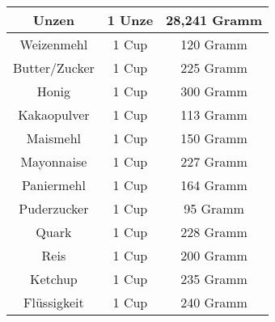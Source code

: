 \begin{center}
\begin{tabular}{|c|c|c|}
\hline 
Unzen & 1 Unze & 28,241 Gramm \\ 
\hline 
Weizenmehl & 1 Cup & 120 Gramm \\ 
\hline 
Butter/Zucker & 1 Cup & 225 Gramm \\ 
\hline 
Honig & 1 Cup & 300 Gramm \\ 
\hline 
Kakaopulver & 1 Cup & 113 Gramm \\ 
\hline 
Maismehl & 1 Cup & 150 Gramm \\ 
\hline 
Mayonnaise & 1 Cup & 227 Gramm \\ 
\hline 
Paniermehl & 1 Cup & 164 Gramm \\ 
\hline 
Puderzucker & 1 Cup & 95 Gramm \\ 
\hline 
Quark & 1 Cup & 228 Gramm \\ 
\hline 
Reis & 1 Cup & 200 Gramm \\ 
\hline 
Ketchup & 1 Cup & 235 Gramm \\ 
\hline 
Flüssigkeit & 1 Cup & 240 Gramm \\ 
\hline 
\end{tabular} 

\vspace{5em}


\end{center}
